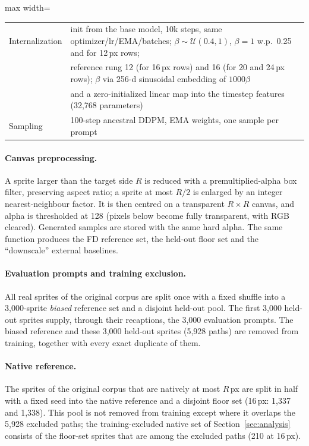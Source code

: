 \begin{table}[h]
\begin{adjustbox}{max width=\linewidth}
\begin{tabular}{@{}ll@{}}
Internalization & init from the base model, 10k steps, same optimizer/lr/EMA/batches; $\beta\sim\mathcal U(0.4,1)$, $\beta{=}1$ w.p.\ 0.25 and for 12\,px rows; \\
 & reference rung 12 (for 16\,px rows) and 16 (for 20 and 24\,px rows); $\beta$ via 256-d sinusoidal embedding of $1000\beta$ \\
 & and a zero-initialized linear map into the timestep features (32,768 parameters) \\
Sampling & 100-step ancestral DDPM, EMA weights, one sample per prompt \\
\bottomrule
\end{tabular}
\end{adjustbox}
\end{table}

\paragraph{Canvas preprocessing.} A sprite larger than the target side $R$ is reduced with a premultiplied-alpha box
filter, preserving aspect ratio; a sprite at most $R/2$ is enlarged by an integer nearest-neighbour factor. It is then
centred on a transparent $R\times R$ canvas, and alpha is thresholded at 128 (pixels below become fully transparent,
with RGB cleared). Generated samples are stored with the same hard alpha. The same function produces the FD reference
set, the held-out floor set and the ``downscale'' external baselines.

\paragraph{Evaluation prompts and training exclusion.} All real sprites of the original corpus are split once with a
fixed shuffle into a 3,000-sprite \emph{biased} reference set and a disjoint held-out pool. The first 3,000 held-out
sprites supply, through their recaptions, the 3,000 evaluation prompts. The biased reference and these 3,000 held-out
sprites (5,928 paths) are removed from training, together with every exact duplicate of them.

\paragraph{Native reference.} The sprites of the original corpus that are natively at most $R$\,px are split in half with
a fixed seed into the native reference and a disjoint floor set (16\,px: 1,337 and 1,338). This pool is not removed from
training except where it overlaps the 5,928 excluded paths; the training-excluded native set of
Section~\ref{sec:analysis} consists of the floor-set sprites that are among the excluded paths (210 at 16\,px).


